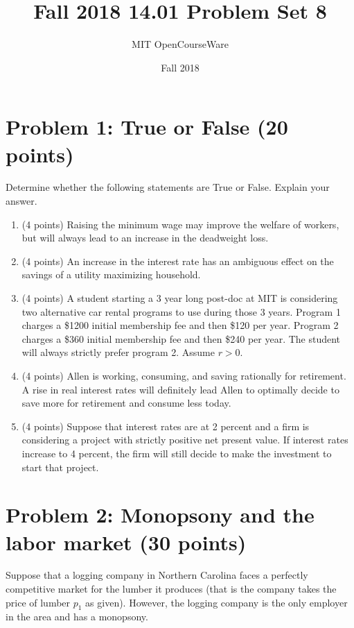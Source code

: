 \documentclass{article}
\title{Fall 2018 14.01 Problem Set 8}
\author{MIT OpenCourseWare}
\date{Fall 2018}
\begin{document}
\maketitle

\section*{Problem 1: True or False (20 points)}

Determine whether the following statements are True or False. Explain your answer.

\begin{enumerate}
\item (4 points) Raising the minimum wage may improve the welfare of workers, but will always lead to an increase in the deadweight loss.
\item (4 points) An increase in the interest rate has an ambiguous eﬀect on the savings of a utility maximizing household.
\item (4 points) A student starting a 3 year long post-doc at MIT is considering two alternative car rental programs to use during those 3 years. Program 1 charges a \$1200 initial membership fee and then \$120 per year. Program 2 charges a \$360 initial membership fee and then \$240 per year. The student will always strictly prefer program 2. Assume $r > 0$.
\item (4 points) Allen is working, consuming, and saving rationally for retirement. A rise in real interest rates will deﬁnitely lead Allen to optimally decide to save more for retirement and consume less today.
\item (4 points) Suppose that interest rates are at 2 percent and a ﬁrm is considering a project with strictly positive net present value. If interest rates increase to 4 percent, the ﬁrm will still decide to make the investment to start that project.
\end{enumerate}

\section*{Problem 2: Monopsony and the labor market (30 points)}

Suppose that a logging company in Northern Carolina faces a perfectly competitive market for the lumber it produces (that is the company takes the price of lumber $p_1$ as given). However, the logging company is the only employer in the area and has a monopsony.
\end{document}

